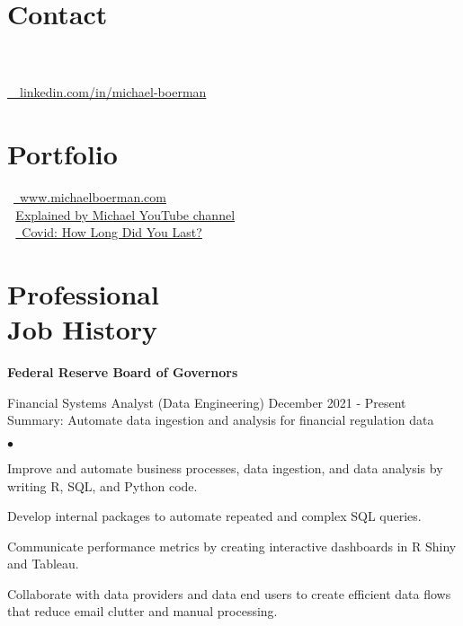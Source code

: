 \documentclass[margin, line]{res}
\newenvironment{list2}{
  \begin{list}{$\bullet$}{%
      \setlength{\itemsep}{0.04in}
      \setlength{\parsep}{0in} \setlength{\parskip}{0in}
      \setlength{\topsep}{0.05in} \setlength{\partopsep}{0in} 
      \setlength{\leftmargin}{\dimexpr 26pt-0.05in}}}
    {\end{list}}
\begin{document}
\address{Detail-oriented data scientist with M.S. + 2 years' experience driving decisions by modeling economic and financial data.}
\begin{resume}

\vspace{-1mm}
\section{\sc Contact}

 \\
 \\
\faLinkedinIn  \href{https://www.linkedin.com/in/michael-boerman}{\ttfamily \, \, linkedin.com/in/michael-boerman}\\
\vspace{-.65cm}


\section{\sc Portfolio}
\faBriefcase \, \href{https://www.michaelboerman.com/}{\ttfamily  \, www.michaelboerman.com}\\
 \,\, \href{https://www.youtube.com/channel/UCxFMrMb6PrS7SOrQi-BfMUw/videos?view=0&sort=p&flow=grid}{ Explained by Michael YouTube channel}\\
\faChartLine \,\, \href{https://michaelboerman.shinyapps.io/covid_percentiles/}{\, Covid: How Long Did You Last?}\\
\vspace{-.35cm}


\section{\sc Professional \\ Job History }
{\bf Federal Reserve Board of Governors}\\

\vspace{-.65cm}

Financial Systems Analyst (Data Engineering) \hfill December 2021 - Present\\
\hspace*{3mm} 
    Summary: Automate data ingestion and analysis for financial regulation data
\hspace*{3mm}
    \begin{list2}
        \item Improve and automate business processes, data ingestion, and data analysis by writing R, SQL, and Python code.
        \item Develop internal packages to automate repeated and complex SQL queries.
        \item Communicate performance metrics by creating interactive dashboards in R Shiny and Tableau.
        \item Collaborate with data providers and data end users to create efficient data flows that reduce email clutter and manual processing.
    \end{list2}



\end{resume}
\end{document}
